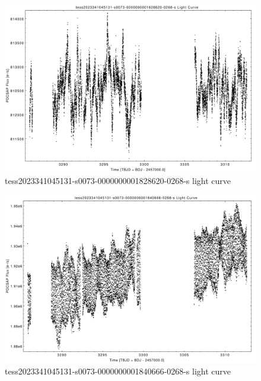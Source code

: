 \documentclass[a4paper,12pt]{article}
\begin{document}
\begin{figure}[htbp]
    \centering
    \includegraphics[width = 1\textwidth]{
      lightcurves/tess2023341045131-s0073-0000000001828620-0268-s.pdf}
    \caption{tess2023341045131-s0073-0000000001828620-0268-s light curve}
\end{figure}
\begin{figure}[htbp]
    \centering
    \includegraphics[width = 1\textwidth]{
      lightcurves/tess2023341045131-s0073-0000000001840666-0268-s.pdf}
    \caption{tess2023341045131-s0073-0000000001840666-0268-s light curve}
\end{figure}
\end{document}
